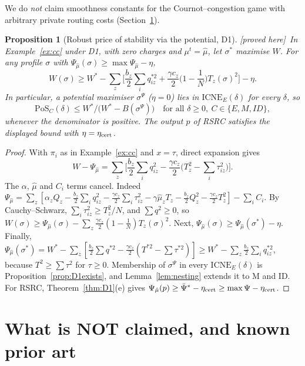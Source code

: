 \documentclass[11pt]{article}
\newtheorem{proposition}[theorem]{Proposition}
\theoremstyle{definition}
\theoremstyle{remark}
\newcommand{\ICNE}{\mathrm{ICNE}}
\newcommand{\PROVED}{\textsf{[proved here]}}
\begin{document}
\noindent We do \emph{not} claim smoothness constants for the Cournot--congestion game with arbitrary private routing costs (Section~\ref{sec:notclaimed}).

\begin{proposition}[Robust price of stability via the potential, D1]\label{prop:pos} \PROVED\
In Example~\ref{ex:cc} under D1, with zero charges and $\mu^t=\hat\mu$, let $\sigma^*$ maximise $W$. For any profile $\sigma$ with $\Psi_{\hat\mu}(\sigma)\ge\max\Psi_{\hat\mu}-\eta$,
\[W(\sigma)\ge W^*-\sum_z\Big[\frac{b_z}{2}\sum_iq^{*2}_{iz}+\frac{\gamma c_z}{2}\Big(1-\frac1N\Big)T_z(\sigma)^2\Big]-\eta.\]
In particular, a potential maximiser $\sigma^\Psi$ ($\eta=0$) lies in $\ICNE_E(\delta)$ for every $\delta$, so
\[\mathrm{PoS}_C(\delta)\le W^*/\big(W^*-B(\sigma^\Psi)\big)\quad\text{for all }\delta\ge0,\ C\in\{E,M,ID\},\]
whenever the denominator is positive. The output $p$ of RSRC satisfies the displayed bound with $\eta=\eta_{\rm cert}$.
\end{proposition}
\begin{proof}
With $\pi_i$ as in Example~\ref{ex:cc} and $x=\tau$, direct expansion gives
\[W-\Psi_{\hat\mu}=\sum_z\Big[\frac{b_z}{2}\sum_iq_{iz}^2-\frac{\gamma c_z}{2}\Big(T_z^2-\sum_i\tau_{iz}^2\Big)\Big].\]
The $\alpha$, $\hat\mu$ and $C_i$ terms cancel. Indeed $\Psi_{\hat\mu}=\sum_z[\alpha_zQ_z-\frac{b_z}{2}\sum_iq_{iz}^2-\frac{\gamma c_z}{2}\sum_i\tau_{iz}^2-\gamma\hat\mu_zT_z-\frac{b_z}{2}Q_z^2-\frac{\gamma c_z}{2}T_z^2]-\sum_iC_i$. By Cauchy--Schwarz, $\sum_i\tau_{iz}^2\ge T_z^2/N$, and $\sum q^2\ge0$, so $W(\sigma)\ge\Psi_{\hat\mu}(\sigma)-\sum_z\frac{\gamma c_z}{2}(1-\frac1N)T_z(\sigma)^2$. Next, $\Psi_{\hat\mu}(\sigma)\ge\Psi_{\hat\mu}(\sigma^*)-\eta$. Finally, $\Psi_{\hat\mu}(\sigma^*)=W^*-\sum_z[\frac{b_z}{2}\sum q^{*2}-\frac{\gamma c_z}{2}(T^{*2}-\sum\tau^{*2})]\ge W^*-\sum_z\frac{b_z}{2}\sum_iq_{iz}^{*2}$, because $T^2\ge\sum\tau^2$ for $\tau\ge0$. Membership of $\sigma^\Psi$ in every $\ICNE_E(\delta)$ is Proposition~\ref{prop:D1exists}, and Lemma~\ref{lem:nesting} extends it to M and ID. For RSRC, Theorem~\ref{thm:D1}(e) gives $\Psi_{\hat\mu}(p)\ge\bar\Psi^*-\eta_{\rm cert}\ge\max\Psi-\eta_{\rm cert}$.
\end{proof}

\section{What is NOT claimed, and known prior art}\label{sec:notclaimed}
\end{document}

